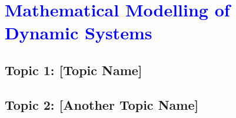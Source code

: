 \chapter{\textcolor{blue}{Mathematical Modelling of Dynamic Systems}}

\section{Topic 1: [Topic Name]}

\section{Topic 2: [Another Topic Name]}